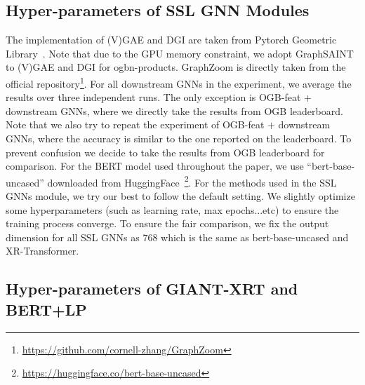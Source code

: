 \documentclass{article} \usepackage{iclr2022_conference,times}
\begin{document}
\subsection{Hyper-parameters of SSL GNN Modules}
\label{apx:hparams-ssl-baseline}

The implementation of (V)GAE and DGI are taken from Pytorch Geometric Library~\citep{fey2019fast}. Note that due to the GPU memory constraint, we adopt GraphSAINT~\citep{graphsaint-iclr20} to (V)GAE and DGI for ogbn-products. GraphZoom is directly taken from the official repository\footnote{\url{https://github.com/cornell-zhang/GraphZoom}}. For all downstream GNNs in the experiment, we average the results over three independent runs. The only exception is OGB-feat + downstream GNNs, where we directly take the results from OGB leaderboard. Note that we also try to repeat the experiment of OGB-feat + downstream GNNs, where the accuracy is similar to the one reported on the leaderboard. To prevent confusion we decide to take the results from OGB leaderboard for comparison. For the BERT model used throughout the paper, we use ``bert-base-uncased'' downloaded from HuggingFace~\footnote{\url{https://huggingface.co/bert-base-uncased}}. For the methods used in the SSL GNNs module, we try our best to follow the default setting. We slightly optimize some hyperparameters (such as learning rate, max epochs...etc) to ensure the training process converge. To ensure the fair comparison, we fix the output dimension for all SSL GNNs as $768$ which is the same as bert-base-uncased and XR-Transformer.

\subsection{Hyper-parameters of GIANT-XRT and BERT+LP}
\label{apx:hparams-giant-xrt}
\end{document}
